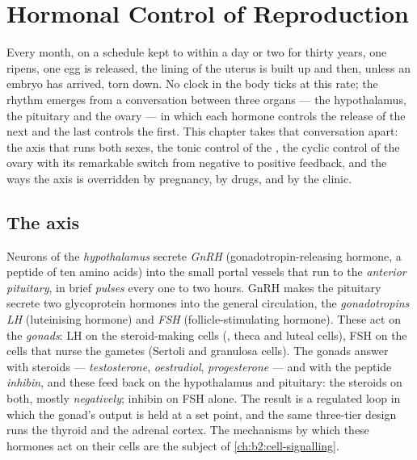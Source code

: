 \chapter{Hormonal Control of Reproduction}\label{ch:b2:reproductive-hormones}

Every month, on a schedule kept to within a day or two for thirty
years, one  ripens, one egg is released, the lining of the
uterus is built up and then, unless an embryo has arrived, torn
down. No clock in the body ticks at this rate; the rhythm emerges
from a conversation between three organs --- the hypothalamus, the
pituitary and the ovary --- in which each hormone controls the
release of the next and the last controls the first. This chapter
takes that conversation apart: the axis that runs both sexes, the
tonic control of the , the cyclic control of the ovary with
its remarkable switch from negative to positive feedback, and the
ways the axis is overridden by pregnancy, by drugs, and by the
clinic.

\section{The axis}

\begin{definition}\label{def:b2:reproductive-hormones:axis}
Neurons of the \emph{hypothalamus} secrete \emph{GnRH}
(gonadotropin-releasing hormone, a peptide of ten amino acids) into
the small portal vessels that run to the \emph{anterior pituitary},
in brief \emph{pulses} every one to two hours. GnRH makes the
pituitary secrete two glycoprotein hormones into the general
circulation, the \emph{gonadotropins} \emph{LH} (luteinising
hormone) and \emph{FSH} (follicle-stimulating hormone). These act on
the \emph{gonads}: LH on the steroid-making cells (,
theca and luteal cells), FSH on the cells that nurse the gametes
(Sertoli and granulosa cells). The gonads answer with steroids ---
\emph{testosterone}, \emph{oestradiol}, \emph{progesterone} --- and
with the peptide \emph{inhibin}, and these feed back on the
hypothalamus and pituitary: the steroids on both, mostly
\emph{negatively}; inhibin on FSH alone. The result is a regulated
loop in which the gonad's output is held at a set point, and the
same three-tier design runs the thyroid and the adrenal cortex. The
mechanisms by which these hormones act on their cells are the
subject of \cref{ch:b2:cell-signalling}.
\end{definition}

